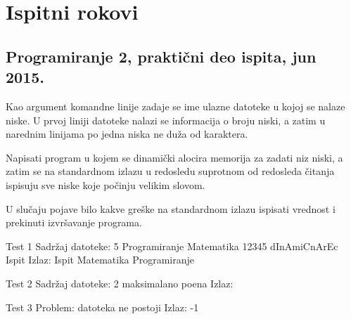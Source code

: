 
\chapter{Ispitni rokovi}


\section{Programiranje 2, praktični deo ispita, jun 2015.}


\begin{Exercise}[label=901]

Kao argument komandne linije zadaje se ime ulazne datoteke u kojoj se nalaze niske. U prvoj liniji datoteke nalazi se informacija o broju niski, a zatim u narednim linijama po jedna niska ne duža od  karaktera.
  
Napisati program u kojem se dinamički alocira memorija za zadati niz niski, a zatim se na standardnom izlazu u redosledu suprotnom od redosleda čitanja ispisuju sve niske koje počinju velikim slovom. 

U slučaju pojave bilo kakve greške na standardnom izlazu ispisati vrednost  i prekinuti izvršavanje programa.

\begin{minitest}
\begin{test}{Test 1}
Sadržaj datoteke:  
 5                             
 Programiranje	                               
 Matematika		                         
 12345
 dInAmiCnArEc
 Ispit
Izlaz:           
 Ispit                                                                
 Matematika
 Programiranje
\end{test}
\end{minitest}
\begin{minitest}
\begin{test}{Test 2}
Sadržaj datoteke:               
  2                                             
  maksimalano               
  poena
Izlaz: 
\end{test}
\end{minitest}
\begin{minitest}
\begin{test}{Test 3}
Problem: 
  datoteka 
   ne postoji
Izlaz:    
  -1       
\end{test}
\end{minitest}


\end{Exercise}
\begin{Answer}[ref=901]
\end{Answer}


